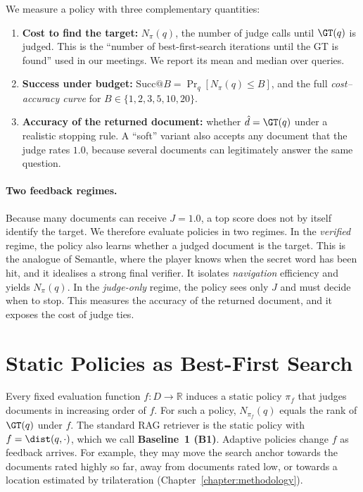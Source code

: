 We measure a policy with three complementary quantities:
\begin{enumerate}
  \item \textbf{Cost to find the target:} $N_\pi(q)$, the number of judge calls until $\GT(q)$ is judged. This is the ``number of best-first-search iterations until the GT is found'' used in our meetings. We report its mean and median over queries.
  \item \textbf{Success under budget:} $\mathrm{Succ}@B=\Pr_q[N_\pi(q)\le B]$, and the full \emph{cost--accuracy curve} for $B\in\{1,2,3,5,10,20\}$.
  \item \textbf{Accuracy of the returned document:} whether $\hat d=\GT(q)$ under a realistic stopping rule. A ``soft'' variant also accepts any document that the judge rates $1.0$, because several documents can legitimately answer the same question.
\end{enumerate}

\paragraph{Two feedback regimes.}
Because many documents can receive $J=1.0$, a top score does not by itself identify the target. We therefore evaluate policies in two regimes. In the \emph{verified} regime, the policy also learns whether a judged document is the target. This is the analogue of Semantle, where the player knows when the secret word has been hit, and it idealises a strong final verifier. It isolates \emph{navigation} efficiency and yields $N_\pi(q)$. In the \emph{judge-only} regime, the policy sees only $J$ and must decide when to stop. This measures the accuracy of the returned document, and it exposes the cost of judge ties.

\section{Static Policies as Best-First Search}

Every fixed evaluation function $f:D\to\mathbb{R}$ induces a static policy $\pi_f$ that judges documents in increasing order of $f$. For such a policy, $N_{\pi_f}(q)$ equals the rank of $\GT(q)$ under $f$. The standard RAG retriever is the static policy with $f=\dist(q,\cdot)$, which we call \textbf{Baseline~1 (B1)}. Adaptive policies change $f$ as feedback arrives. For example, they may move the search anchor towards the documents rated highly so far, away from documents rated low, or towards a location estimated by trilateration (Chapter~\ref{chapter:methodology}).

